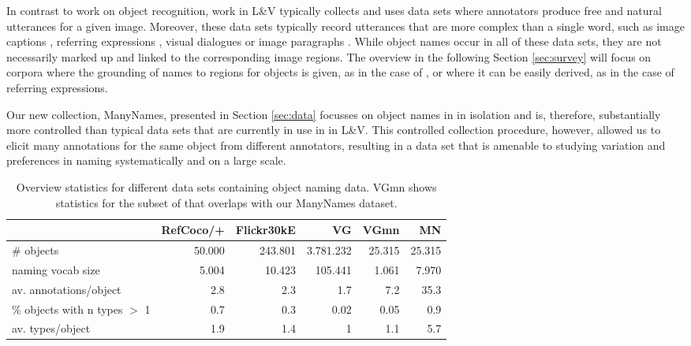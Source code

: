 In contrast to work on object recognition, work in L\&V typically collects and uses data sets where annotators produce free and natural utterances for a given image. 
Moreover, these data sets typically record utterances that are more complex than a single word, such as image captions \cite{fangetal:2015,devlin:imcaqui,Bernardietal:automatic}, referring expressions \cite{Kazemzadeh2014,mao15,Yu2016}, visual dialogues \cite{das2017visual,vries2017guesswhat} or image paragraphs \cite{krause2017hierarchical}. While object names occur in all of these data sets, they are not necessarily marked up and linked to the corresponding image regions. The overview in the following Section \ref{sec:survey} will focus on corpora where the grounding of names to regions for objects is given, as in the case of \vgenome \cite{krishna2016visualgenome}, or where it can be easily derived, as in the case of referring expressions.

Our new collection, ManyNames, presented in Section \ref{sec:data} focusses on object names in in isolation and is, therefore, substantially more controlled than typical data sets that are currently in use in in L\&V. This controlled collection procedure, however, allowed us to elicit many annotations for the same object from different annotators, resulting in a data set that is amenable to studying variation and preferences in naming systematically and on a large scale.

\begin{table*}[htb]
  \centering
  \begin{tabular}{lrrrrr}
    \toprule
    &   RefCoco/+  &  Flickr30kE &           VG &      VGmn &        MN \\
    \midrule
    \# objects & 50.000 & 243.801 & 3.781.232 & 25.315 & 25.315 \\
    naming vocab size &  5.004 &  10.423 &   105.441 &  1.061 &  7.970 \\
    av. annotations/object &      2.8 &       2.3 &         1.7 &      7.2 &     35.3 \\
    \% objects with n types $>$ 1 &      0.7 &       0.3 &         0.02 &      0.05 &      0.9 \\
    av. types/object &      1.9 &       1.4 &         1 &      1.1 &      5.7 \\
    \bottomrule
  \end{tabular}
  \label{tab:compare}
  \caption{Overview statistics for different data sets containing object naming data. VGmn shows statistics for the subset of \vg that overlaps with our ManyNames dataset.}
\end{table*}


